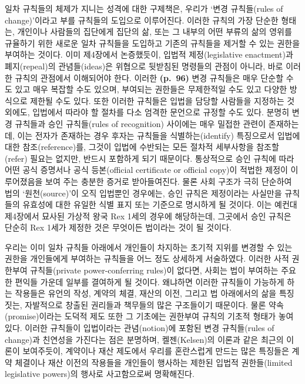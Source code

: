 일차 규칙들의 체제가 지니는  성격에 대한 구제책은,
우리가 ‘변경 규칙들(rules of change)’이라고 부를 규칙들의 도입으로
이루어진다. 이러한 규칙의 가장 단순한 형태는, 개인이나 사람들의 집단에게
집단의 삶, 또는 그 내부의 어떤 부류의 삶의 영위를 규율하기 위한 새로운
일차 규칙들을 도입하고 기존의 규칙들을 제거할 수 있는 권한을 부여하는
것이다. 이미 제4장에서 논증했듯이, 입법적 제정(legislative enactment)과
폐지(repeal)의 관념들(ideas)은 위협으로 뒷받침된 명령들의 관점이 아니라,
바로 이러한 규칙의 관점에서 이해되어야 한다. 이러한 \textbf{(p.~96)}
변경 규칙들은 매우 단순할 수도 있고 매우 복잡할 수도 있으며, 부여되는
권한들은 무제한적일 수도 있고 다양한 방식으로 제한될 수도 있다. 또한
이러한 규칙들은 입법을 담당할 사람들을 지정하는 것 외에도, 입법에서
따라야 할 절차를 다소 엄격한 문언으로 규정할 수도 있다. 분명히 변경
규칙들과 승인 규칙들(rules of recognition) 사이에는 매우 밀접한 관련이
존재하는데, 이는 전자가 존재하는 경우 후자는 규칙들을 식별하는(identify)
특징으로서 입법에 대한 참조(reference)를, 그것이 입법에 수반되는 모든
절차적 세부사항을 참조할(refer) 필요는 없지만, 반드시 포함하게 되기
때문이다. 통상적으로 승인 규칙에 따라 어떤 공식 증명서나 공식
등본(official certificate or official copy)이 적법한 제정이 이루어졌음을
보여 주는 충분한 증거로 받아들여진다. 물론 사회 구조가 극히 단순하여
법의 ‘원천(source)’이 오직 입법뿐인 경우에는, 승인 규칙은 제정이라는
사실만을 규칙들의 유효성에 대한 유일한 식별 표지 또는 기준으로 명시하게
될 것이다. 이는 예컨대 제4장에서 묘사된 가상적 왕국 Rex 1세의 경우에
해당하는데, 그곳에서 승인 규칙은 단순히 Rex 1세가 제정한 것은 무엇이든
법이라는 것이 될 것이다.

우리는 이미 일차 규칙들 아래에서 개인들이 차지하는 초기적 지위를 변경할
수 있는 권한을 개인들에게 부여하는 규칙들을 어느 정도 상세하게
서술하였다. 이러한 사적 권한부여 규칙들(private power-conferring
rules)이 없다면, 사회는 법이 부여하는 주요한 편익들 가운데 일부를
결여하게 될 것이다. 왜냐하면 이러한 규칙들이 가능하게 하는 작용들은
유언의 작성, 계약의 체결, 재산의 이전, 그리고 법 아래에서의 삶을
특징짓는, 자발적으로 창출된 권리들과 책무들의 많은 구조들이기 때문이다.
물론 약속(promise)이라는 도덕적 제도 또한 그 기초에는 권한부여 규칙의
기초적 형태가 놓여 있다. 이러한 규칙들이 입법이라는 관념(notion)에
포함된 변경 규칙들(rules of change)과 친연성을 가진다는 점은 분명하며,
켈젠(Kelsen)의 이론과 같은 최근의 이론이 보여주듯이, 계약이나 재산
제도에서 우리를 혼란스럽게 만드는 많은 특징들은 계약 체결이나 재산
이전의 작용들을 개인들이 행사하는 제한된 입법적 권한들(limited
legislative powers)의 행사로 사고함으로써 명확해진다.

